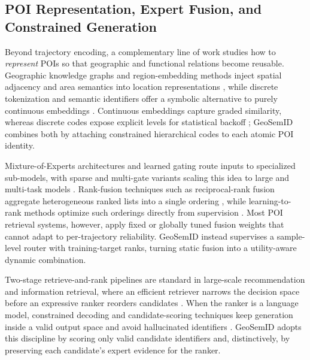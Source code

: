 \documentclass[journal]{IEEEtran}
\begin{document}
\subsection{POI Representation, Expert Fusion, and Constrained Generation}
\label{subsec:rw_representation_fusion}

Beyond trajectory encoding, a complementary line of work studies how to
\emph{represent} POIs so that geographic and functional relations become
reusable. Geographic knowledge graphs and region-embedding methods
\cite{yan2017place2vec,wang2017region,yao2018zone,huang2022erniegeol} inject
spatial adjacency and area semantics into location representations
\cite{mai2020space2vec}, while discrete tokenization and semantic identifiers
offer a symbolic alternative to purely continuous embeddings
\cite{tay2022dsi,rajput2023tiger,wang2022nci,oord2017vqvae}.
Continuous embeddings capture graded similarity, whereas discrete codes expose
explicit levels for statistical backoff \cite{hua2023index}; GeoSemID combines
both by attaching constrained hierarchical codes to each atomic POI identity.

Mixture-of-Experts architectures and learned gating
\cite{jacobs1991moe,jordan1994hme,shazeer2017moe} route inputs to specialized
sub-models, with sparse and multi-gate variants scaling this idea to large and
multi-task models \cite{fedus2022switch,lepikhin2021gshard,ma2018mmoe}.
Rank-fusion techniques such as reciprocal-rank fusion aggregate heterogeneous
ranked lists into a single ordering \cite{cormack2009rrf,dwork2001rank}, while
learning-to-rank methods optimize such orderings directly from supervision
\cite{liu2009ltr,burges2005ranknet,cao2007listnet}.
Most POI retrieval systems, however, apply fixed or globally tuned fusion
weights that cannot adapt to per-trajectory reliability. GeoSemID instead
supervises a sample-level router with training-target ranks, turning static
fusion into a utility-aware dynamic combination.

Two-stage retrieve-and-rank pipelines are standard in large-scale
recommendation and information retrieval, where an efficient retriever narrows
the decision space before an expressive ranker reorders candidates
\cite{covington2016youtube,karpukhin2020dpr,khattab2020colbert,nogueira2019bertrerank}.
When the ranker is a language model, constrained decoding and candidate-scoring
techniques keep generation inside a valid output space and avoid hallucinated
identifiers \cite{holtzman2020curious,post2018constrained,decao2021genre,geng2023grammar}.
GeoSemID adopts this discipline by scoring only valid candidate identifiers and,
distinctively, by preserving each candidate's expert evidence for the ranker.
\end{document}
